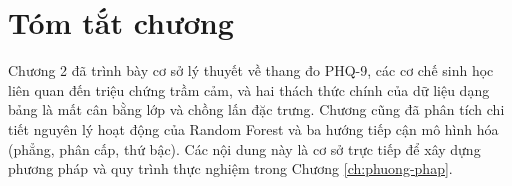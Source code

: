 \section{Tóm tắt chương}
\label{sec:tom-tat-chuong-2}

Chương 2 đã trình bày cơ sở lý thuyết về thang đo PHQ-9, các cơ chế sinh học liên quan đến triệu chứng trầm cảm, và hai thách thức chính của dữ liệu dạng bảng là mất cân bằng lớp và chồng lấn đặc trưng. Chương cũng đã phân tích chi tiết nguyên lý hoạt động của Random Forest và ba hướng tiếp cận mô hình hóa (phẳng, phân cấp, thứ bậc). Các nội dung này là cơ sở trực tiếp để xây dựng phương pháp và quy trình thực nghiệm trong Chương \ref{ch:phuong-phap}.
